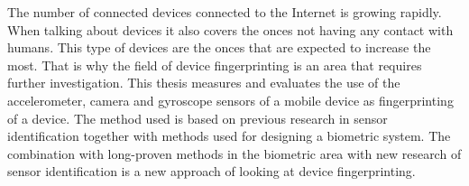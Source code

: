 The number of connected devices connected to the Internet is growing rapidly. When talking about devices it also covers the onces not having any contact with humans. This type of devices are the onces that are expected to increase the most. That is why the field of device fingerprinting is an area that requires further investigation. This thesis measures and evaluates the use of the accelerometer, camera and gyroscope sensors of a mobile device as fingerprinting of a device. The method used is based on previous research in sensor identification together with methods used for designing a biometric system. The combination with long-proven methods in the biometric area with new research of sensor identification is a new approach of looking at device fingerprinting.
